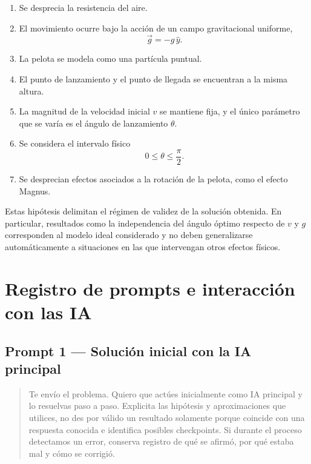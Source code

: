\begin{enumerate}[label=H\arabic*.]
    \item Se desprecia la resistencia del aire.
    
    \item El movimiento ocurre bajo la acción de un campo gravitacional uniforme,
    \[
    \vec g=-g\,\hat y.
    \]
    
    \item La pelota se modela como una partícula puntual.
    
    \item El punto de lanzamiento y el punto de llegada se encuentran a la misma altura.
    
    \item La magnitud de la velocidad inicial \(v\) se mantiene fija, y el único parámetro que se varía es el ángulo de lanzamiento \(\theta\).
    
    \item Se considera el intervalo físico
    \[
    0\leq\theta\leq\frac{\pi}{2}.
    \]
    
    \item Se desprecian efectos asociados a la rotación de la pelota, como el efecto Magnus.
\end{enumerate}

Estas hipótesis delimitan el régimen de validez de la solución obtenida. En particular, resultados como la independencia del ángulo óptimo respecto de \(v\) y \(g\) corresponden al modelo ideal considerado y no deben generalizarse automáticamente a situaciones en las que intervengan otros efectos físicos.



\section{Registro de prompts e interacción con las IA}

\subsection*{Prompt 1 --- Solución inicial con la IA principal}

\begin{quote}
Te envío el problema. Quiero que actúes inicialmente como IA principal y lo resuelvas paso a paso. Explicita las hipótesis y aproximaciones que utilices, no des por válido un resultado solamente porque coincide con una respuesta conocida e identifica posibles checkpoints. Si durante el proceso detectamos un error, conserva registro de qué se afirmó, por qué estaba mal y cómo se corrigió.
\end{quote}

